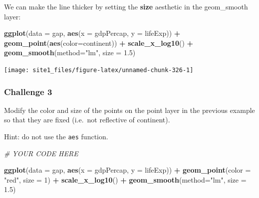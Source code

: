 \documentclass[]{book}
\newenvironment{Shaded}{\begin{snugshade}}{\end{snugshade}}
\newcommand{\KeywordTok}[1]{\textcolor[rgb]{0.13,0.29,0.53}{\textbf{#1}}}
\newcommand{\DataTypeTok}[1]{\textcolor[rgb]{0.13,0.29,0.53}{#1}}
\newcommand{\DecValTok}[1]{\textcolor[rgb]{0.00,0.00,0.81}{#1}}
\newcommand{\FloatTok}[1]{\textcolor[rgb]{0.00,0.00,0.81}{#1}}
\newcommand{\StringTok}[1]{\textcolor[rgb]{0.31,0.60,0.02}{#1}}
\newcommand{\CommentTok}[1]{\textcolor[rgb]{0.56,0.35,0.01}{\textit{#1}}}
\newcommand{\OperatorTok}[1]{\textcolor[rgb]{0.81,0.36,0.00}{\textbf{#1}}}
\newcommand{\NormalTok}[1]{#1}
\begin{document}
We can make the line thicker by setting the \textbf{size} aesthetic in
the geom\_smooth layer:

\begin{Shaded}
\begin{Highlighting}[]
\KeywordTok{ggplot}\NormalTok{(}\DataTypeTok{data =}\NormalTok{ gap, }\KeywordTok{aes}\NormalTok{(}\DataTypeTok{x =}\NormalTok{ gdpPercap, }\DataTypeTok{y =}\NormalTok{ lifeExp)) }\OperatorTok{+}\StringTok{ }
\StringTok{  }\KeywordTok{geom_point}\NormalTok{(}\KeywordTok{aes}\NormalTok{(}\DataTypeTok{color=}\NormalTok{continent)) }\OperatorTok{+}\StringTok{ }
\StringTok{  }\KeywordTok{scale_x_log10}\NormalTok{() }\OperatorTok{+}\StringTok{ }
\StringTok{  }\KeywordTok{geom_smooth}\NormalTok{(}\DataTypeTok{method=}\StringTok{"lm"}\NormalTok{, }\DataTypeTok{size =} \FloatTok{1.5}\NormalTok{)}
\end{Highlighting}
\end{Shaded}

\begin{center}\texttt{[image: site1\_files/figure-latex/unnamed-chunk-326-1]} \end{center}

\subsubsection*{Challenge 3}\label{challenge-3}

Modify the color and size of the points on the point layer in the
previous example so that they are fixed (i.e.~not reflective of
continent).

Hint: do not use the \texttt{aes} function.

\begin{Shaded}
\begin{Highlighting}[]
\CommentTok{# YOUR CODE HERE}

\KeywordTok{ggplot}\NormalTok{(}\DataTypeTok{data =}\NormalTok{ gap, }\KeywordTok{aes}\NormalTok{(}\DataTypeTok{x =}\NormalTok{ gdpPercap, }\DataTypeTok{y =}\NormalTok{ lifeExp)) }\OperatorTok{+}\StringTok{ }
\StringTok{  }\KeywordTok{geom_point}\NormalTok{(}\DataTypeTok{color =} \StringTok{"red"}\NormalTok{, }\DataTypeTok{size =} \DecValTok{1}\NormalTok{) }\OperatorTok{+}\StringTok{ }
\StringTok{  }\KeywordTok{scale_x_log10}\NormalTok{() }\OperatorTok{+}\StringTok{ }
\StringTok{  }\KeywordTok{geom_smooth}\NormalTok{(}\DataTypeTok{method=}\StringTok{"lm"}\NormalTok{, }\DataTypeTok{size =} \FloatTok{1.5}\NormalTok{)}
\end{Highlighting}
\end{Shaded}
\end{document}
